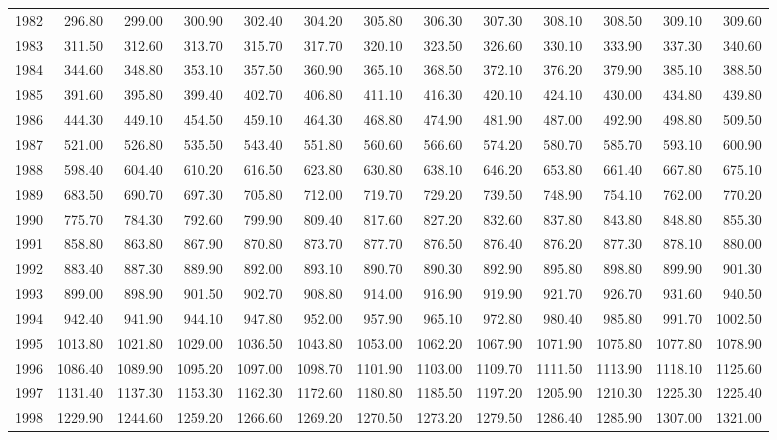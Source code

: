 \begin{longtable}{rrrrrrrrrrrrr}
  1982 & 296.80 & 299.00 & 300.90 & 302.40 & 304.20 & 305.80 & 306.30 & 307.30 & 308.10 & 308.50 & 309.10 & 309.60 \\ 
  1983 & 311.50 & 312.60 & 313.70 & 315.70 & 317.70 & 320.10 & 323.50 & 326.60 & 330.10 & 333.90 & 337.30 & 340.60 \\ 
  1984 & 344.60 & 348.80 & 353.10 & 357.50 & 360.90 & 365.10 & 368.50 & 372.10 & 376.20 & 379.90 & 385.10 & 388.50 \\ 
  1985 & 391.60 & 395.80 & 399.40 & 402.70 & 406.80 & 411.10 & 416.30 & 420.10 & 424.10 & 430.00 & 434.80 & 439.80 \\ 
  1986 & 444.30 & 449.10 & 454.50 & 459.10 & 464.30 & 468.80 & 474.90 & 481.90 & 487.00 & 492.90 & 498.80 & 509.50 \\ 
  1987 & 521.00 & 526.80 & 535.50 & 543.40 & 551.80 & 560.60 & 566.60 & 574.20 & 580.70 & 585.70 & 593.10 & 600.90 \\ 
  1988 & 598.40 & 604.40 & 610.20 & 616.50 & 623.80 & 630.80 & 638.10 & 646.20 & 653.80 & 661.40 & 667.80 & 675.10 \\ 
  1989 & 683.50 & 690.70 & 697.30 & 705.80 & 712.00 & 719.70 & 729.20 & 739.50 & 748.90 & 754.10 & 762.00 & 770.20 \\ 
  1990 & 775.70 & 784.30 & 792.60 & 799.90 & 809.40 & 817.60 & 827.20 & 832.60 & 837.80 & 843.80 & 848.80 & 855.30 \\ 
  1991 & 858.80 & 863.80 & 867.90 & 870.80 & 873.70 & 877.70 & 876.50 & 876.40 & 876.20 & 877.30 & 878.10 & 880.00 \\ 
  1992 & 883.40 & 887.30 & 889.90 & 892.00 & 893.10 & 890.70 & 890.30 & 892.90 & 895.80 & 898.80 & 899.90 & 901.30 \\ 
  1993 & 899.00 & 898.90 & 901.50 & 902.70 & 908.80 & 914.00 & 916.90 & 919.90 & 921.70 & 926.70 & 931.60 & 940.50 \\ 
  1994 & 942.40 & 941.90 & 944.10 & 947.80 & 952.00 & 957.90 & 965.10 & 972.80 & 980.40 & 985.80 & 991.70 & 1002.50 \\ 
  1995 & 1013.80 & 1021.80 & 1029.00 & 1036.50 & 1043.80 & 1053.00 & 1062.20 & 1067.90 & 1071.90 & 1075.80 & 1077.80 & 1078.90 \\ 
  1996 & 1086.40 & 1089.90 & 1095.20 & 1097.00 & 1098.70 & 1101.90 & 1103.00 & 1109.70 & 1111.50 & 1113.90 & 1118.10 & 1125.60 \\ 
  1997 & 1131.40 & 1137.30 & 1153.30 & 1162.30 & 1172.60 & 1180.80 & 1185.50 & 1197.20 & 1205.90 & 1210.30 & 1225.30 & 1225.40 \\ 
  1998 & 1229.90 & 1244.60 & 1259.20 & 1266.60 & 1269.20 & 1270.50 & 1273.20 & 1279.50 & 1286.40 & 1285.90 & 1307.00 & 1321.00 \\ 

\end{longtable}
